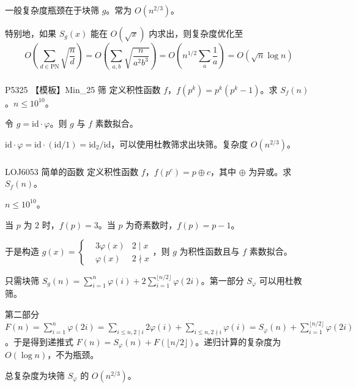 \documentclass[../main.tex]{subfiles}
\begin{document}
\begin{frame}
一般复杂度瓶颈在于块筛 $g$。常为 $O(n^{2/3})$。\pause

特别地，如果 $S_g(x)$ 能在 $O(\sqrt x)$ 内求出，则复杂度优化至
$$
O(\sum_{d\in\text{PN}}\sqrt{\frac{n}{d}})=O(\sum_{a,b}\sqrt{\frac{n}{a^2b^3}})=O(n^{1/2}\sum_a\frac{1}{a})=O(\sqrt n\log n)
$$
\end{frame}

\subsubsection{}

\begin{frame}{P5325 【模板】Min\_25 筛}
定义积性函数 $f$，$f(p^k)=p^k(p^k-1)$。求 $S_f(n)$。$n\le 10^{10}$。\pause
\bigskip

令 $g=\text{id}\cdot\varphi$。则 $g$ 与 $f$ 素数拟合。\pause

$\text{id}\cdot\varphi=\text{id}\cdot(\text{id}/1)=\text{id}_2/\text{id}$，可以使用杜教筛求出块筛。复杂度 $O(n^{2/3})$。
\end{frame}

\subsubsection{}

\begin{frame}{LOJ6053 简单的函数}
定义积性函数 $f$，$f(p^c)=p\oplus c$，其中 $\oplus$ 为异或。求 $S_f(n)$。

$n\le10^{10}$。
\end{frame}

\begin{frame}
当 $p$ 为 $2$ 时，$f(p)=3$。当 $p$ 为奇素数时，$f(p)=p-1$。\pause

于是构造 $g(x)=\left\{\begin{aligned}&3\varphi(x) & 2\mid x\\ &\varphi(x) & 2\nmid x\end{aligned}\right.$，则 $g$ 为积性函数且与 $f$ 素数拟合。\pause

只需块筛 $S_g(n)=\sum\limits_{i=1}^n\varphi(i)+2\sum\limits_{i=1}^{\lfloor n/2\rfloor}\varphi(2i)$。第一部分 $S_{\varphi}$ 可以用杜教筛。\pause

第二部分 $F(n)=\sum\limits_{i=1}^n\varphi(2i)=\sum\limits_{i\le n,2\mid i}2\varphi(i)+\sum\limits_{i\le n,2\nmid i}\varphi(i)=S_{\varphi}(n)+\sum\limits_{i=1}^{\lfloor n/2\rfloor}\varphi(2i)$。于是得到递推式 $F(n)=S_{\varphi}(n)+F(\lfloor n/2\rfloor)$。递归计算的复杂度为 $O(\log n)$，不为瓶颈。\pause

总复杂度为块筛 $S_{\varphi}$ 的 $O(n^{2/3})$。
\end{frame}
\end{document}
